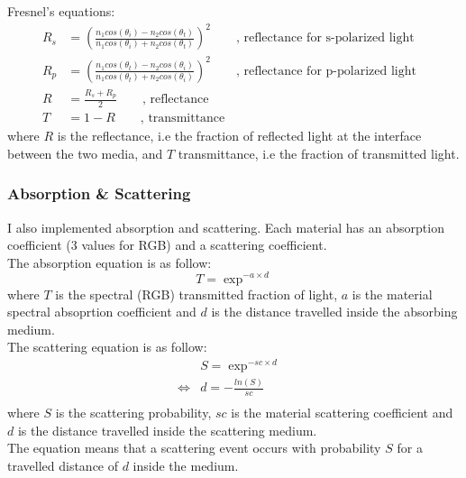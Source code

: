 \documentclass[a4paper,10pt]{article}
\begin{document}
\noindent
Fresnel's equations:
\begin{equation}
\left.\begin{aligned}
    R_s &= (\frac{n_1cos(\theta_i) - n_2cos(\theta_t)}{n_1cos(\theta_i) + n_2cos(\theta_t)})^2 \qquad \text{, reflectance for s-polarized light}& \\
    R_p &= (\frac{n_1cos(\theta_t) - n_2cos(\theta_i)}{n_1cos(\theta_t) + n_2cos(\theta_i)})^2 \qquad \text{, reflectance for p-polarized light}& \\
    R   &= \frac{R_s + R_p}{2} \qquad \text{, reflectance}&\\
    T   &= 1 - R \qquad \text{, transmittance}
\end{aligned}\right.
\end{equation}
where $R$ is the reflectance, i.e the fraction of reflected light at the interface between the two media, and $T$ transmittance, i.e the fraction of transmitted light.

\subsubsection{Absorption \& Scattering}

I also implemented absorption and scattering. Each material has an absorption coefficient (3 values for RGB) and a scattering coefficient. \\
The absorption equation is as follow:
\begin{equation}
	T = \exp^{-a \times d}
\end{equation}
where $T$ is the spectral (RGB) transmitted fraction of light, $a$ is the material spectral absoprtion coefficient and $d$ is the distance travelled inside the absorbing medium. \\

\noindent
The scattering equation is as follow:
\begin{equation}
\left.\begin{aligned}
	&S = \exp^{-sc \times d}& \\
	\iff
	&d = -\frac{ln(S)}{sc}&\\
\end{aligned}\right.
\end{equation}
where $S$ is the scattering probability, $sc$ is the material scattering coefficient and $d$ is the distance travelled inside the scattering medium. \\
The equation means that a scattering event occurs with probability $S$ for a travelled distance of $d$ inside the medium.
\end{document}
